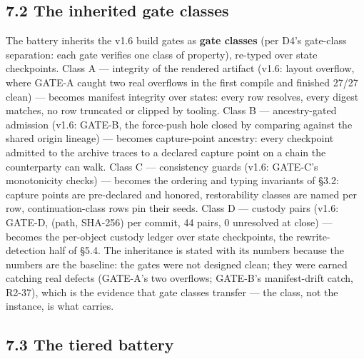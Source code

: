 \documentclass[11pt]{article}
\begin{document}
\subsection{7.2 The inherited gate classes}\label{the-inherited-gate-classes}

The battery inherits the v1.6 build gates as \textbf{gate classes} (per D4's gate-class separation: each gate verifies one class of property), re-typed over state checkpoints. Class A --- integrity of the rendered artifact (v1.6: layout overflow, where GATE-A caught two real overflows in the first compile and finished 27/27 clean) --- becomes manifest integrity over states: every row resolves, every digest matches, no row truncated or clipped by tooling. Class B --- ancestry-gated admission (v1.6: GATE-B, the force-push hole closed by comparing against the shared origin lineage) --- becomes capture-point ancestry: every checkpoint admitted to the archive traces to a declared capture point on a chain the counterparty can walk. Class C --- consistency guards (v1.6: GATE-C's monotonicity checks) --- becomes the ordering and typing invariants of \S{}3.2: capture points are pre-declared and honored, restorability classes are named per row, continuation-class rows pin their seeds. Class D --- custody pairs (v1.6: GATE-D, (path, SHA-256) per commit, 44 pairs, 0 unresolved at close) --- becomes the per-object custody ledger over state checkpoints, the rewrite-detection half of \S{}5.4. The inheritance is stated with its numbers because the numbers are the baseline: the gates were not designed clean; they were earned catching real defects (GATE-A's two overflows; GATE-B's manifest-drift catch, R2-37), which is the evidence that gate classes transfer --- the class, not the instance, is what carries.

\subsection{7.3 The tiered battery}\label{the-tiered-battery}
\end{document}
